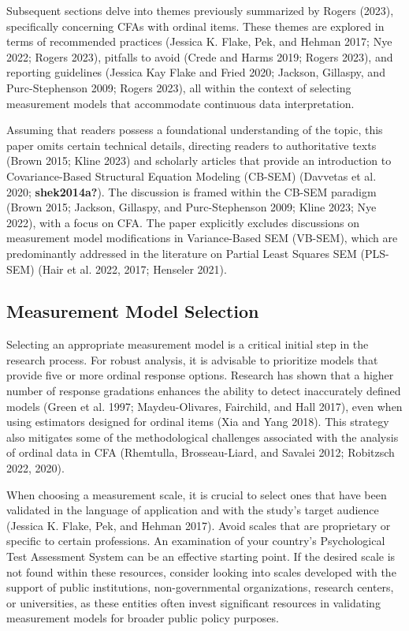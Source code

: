 \documentclass[
  a4paper,
]{article}
\begin{document}
Subsequent sections delve into themes previously summarized by Rogers
(2023), specifically concerning CFAs with ordinal items. These themes
are explored in terms of recommended practices (Jessica K. Flake, Pek,
and Hehman 2017; Nye 2022; Rogers 2023), pitfalls to avoid (Crede and
Harms 2019; Rogers 2023), and reporting guidelines (Jessica Kay Flake
and Fried 2020; Jackson, Gillaspy, and Purc-Stephenson 2009; Rogers
2023), all within the context of selecting measurement models that
accommodate continuous data interpretation.

Assuming that readers possess a foundational understanding of the topic,
this paper omits certain technical details, directing readers to
authoritative texts (Brown 2015; Kline 2023) and scholarly articles that
provide an introduction to Covariance-Based Structural Equation Modeling
(CB-SEM) (Davvetas et al. 2020; \textbf{shek2014a?}). The discussion is
framed within the CB-SEM paradigm (Brown 2015; Jackson, Gillaspy, and
Purc-Stephenson 2009; Kline 2023; Nye 2022), with a focus on CFA. The
paper explicitly excludes discussions on measurement model modifications
in Variance-Based SEM (VB-SEM), which are predominantly addressed in the
literature on Partial Least Squares SEM (PLS-SEM) (Hair et al. 2022,
2017; Henseler 2021).

\subsection{Measurement Model
Selection}\label{measurement-model-selection}

Selecting an appropriate measurement model is a critical initial step in
the research process. For robust analysis, it is advisable to prioritize
models that provide five or more ordinal response options. Research has
shown that a higher number of response gradations enhances the ability
to detect inaccurately defined models (Green et al. 1997;
Maydeu-Olivares, Fairchild, and Hall 2017), even when using estimators
designed for ordinal items (Xia and Yang 2018). This strategy also
mitigates some of the methodological challenges associated with the
analysis of ordinal data in CFA (Rhemtulla, Brosseau-Liard, and Savalei
2012; Robitzsch 2022, 2020).

When choosing a measurement scale, it is crucial to select ones that
have been validated in the language of application and with the study's
target audience (Jessica K. Flake, Pek, and Hehman 2017). Avoid scales
that are proprietary or specific to certain professions. An examination
of your country's Psychological Test Assessment System can be an
effective starting point. If the desired scale is not found within these
resources, consider looking into scales developed with the support of
public institutions, non-governmental organizations, research centers,
or universities, as these entities often invest significant resources in
validating measurement models for broader public policy purposes.
\end{document}
